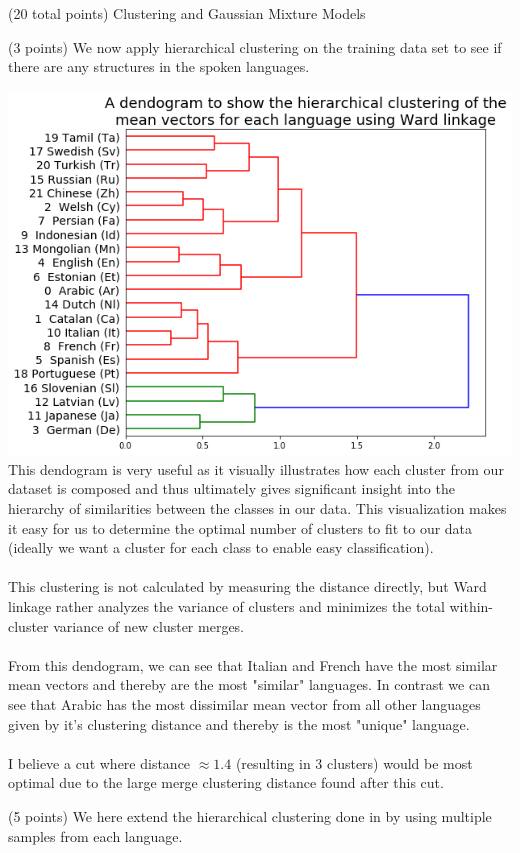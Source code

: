 \documentclass[12pt]{article}
\begin{document}
\begin{question}{(20 total points) Clustering and Gaussian Mixture Models}
\begin{subquestion}{(3 points)
       We now apply hierarchical clustering on the training data set
       to see if there are any structures in the spoken languages.
     }
     

      \begin{answerbox}{52em}
        \includegraphics[width=1\textwidth]{images/q33.png}
        \footnotesize{
        This dendogram is very useful as it visually illustrates how each cluster from our dataset is composed and thus ultimately gives significant insight into the hierarchy of similarities between the classes in our data. This visualization makes it easy for us to determine the optimal number of clusters to fit to our data (ideally we want a cluster for each class to enable easy classification).\\
\\
        This clustering is not calculated by measuring the distance directly, but Ward linkage rather analyzes the variance of clusters and minimizes the total within-cluster variance of new cluster merges.\\
        \\
        From this dendogram, we can see that Italian and French have the most similar mean vectors and thereby are the most "similar" languages. In contrast we can see that Arabic has the most dissimilar mean vector from all other languages given by it's clustering distance and thereby is the most "unique" language.\\
\\
        I believe a cut where distance $\approx 1.4$ (resulting in 3 clusters) would be most optimal due to the large merge clustering distance found after this cut.
        }
      \end{answerbox}
  


   \end{subquestion}
   \begin{subquestion}{(5 points)
       We here extend the hierarchical clustering done in  by
       using multiple samples from each language.
     } \label{Q3.4}



\end{subquestion}
\end{question}
\end{document}
